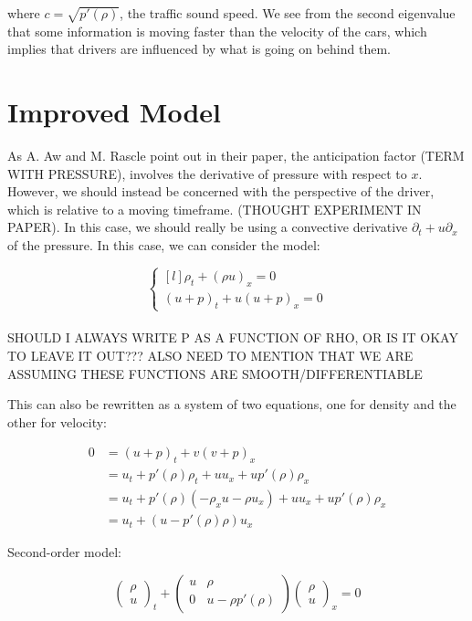 \documentclass{article}
\begin{document}
where $c = \sqrt{p'(\rho)}$, the traffic sound speed.  We see from the second eigenvalue that some information is moving faster than the velocity of the cars, which implies that drivers are influenced by what is going on behind them.

\section{Improved Model}

As A. Aw and M. Rascle point out in their paper, the anticipation factor (TERM WITH PRESSURE), involves the derivative of pressure with respect to $x$.  However, we should instead be concerned with the perspective of the driver, which is relative to a moving timeframe.  (THOUGHT EXPERIMENT IN PAPER).  In this case, we should really be using a convective derivative $\partial_t + u \partial_x$ of the pressure.  In this case, we can consider the model: 

\[ \left\{ \begin{matrix*}[l] \rho_t + (\rho u)_x = 0 \\[1ex] (u + p)_t + u (u + p)_x = 0 \end{matrix*} \right. \] \\

SHOULD I ALWAYS WRITE P AS A FUNCTION OF RHO, OR IS IT OKAY TO LEAVE IT OUT??? ALSO NEED TO MENTION THAT WE ARE ASSUMING THESE FUNCTIONS ARE SMOOTH/DIFFERENTIABLE

This can also be rewritten as a system of two equations, one for density and the other for velocity:

\begin{align*}
0 &= (u + p)_t + v (v + p)_x \\[1ex]
&= u_t + p'(\rho) \rho_t + u u_x + u p'(\rho) \rho_x \\[1ex]
&= u_t + p'(\rho) (-\rho_x u - \rho u_x) + u u_x + u p'(\rho) \rho_x \\[1ex]
&= u_t + (u - p'(\rho) \rho) u_x 
\end{align*}

Second-order model:

\[ \begin{pmatrix} \rho \\[1ex] u \end{pmatrix}_t + \begin{pmatrix} u & \rho \\[1ex] 0 & u - \rho p'(\rho) \end{pmatrix} \begin{pmatrix} \rho \\[1ex] u \end{pmatrix}_x = 0 \] \\
\end{document}
